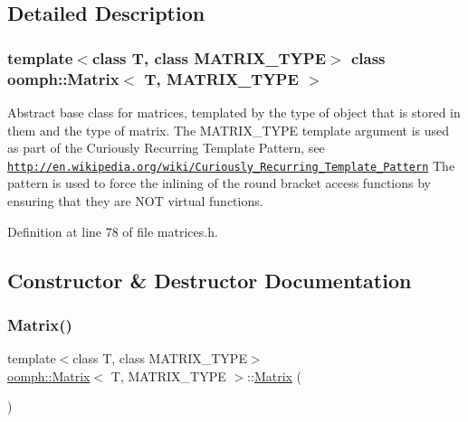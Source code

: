 \subsection{Detailed Description}
\subsubsection*{template$<$class T, class M\+A\+T\+R\+I\+X\+\_\+\+T\+Y\+PE$>$\newline
class oomph\+::\+Matrix$<$ T, M\+A\+T\+R\+I\+X\+\_\+\+T\+Y\+P\+E $>$}

Abstract base class for matrices, templated by the type of object that is stored in them and the type of matrix. The M\+A\+T\+R\+I\+X\+\_\+\+T\+Y\+PE template argument is used as part of the Curiously Recurring Template Pattern, see \href{http://en.wikipedia.org/wiki/Curiously_Recurring_Template_Pattern}{\tt http\+://en.\+wikipedia.\+org/wiki/\+Curiously\+\_\+\+Recurring\+\_\+\+Template\+\_\+\+Pattern} The pattern is used to force the inlining of the round bracket access functions by ensuring that they are N\+OT virtual functions. 

Definition at line 78 of file matrices.\+h.



\subsection{Constructor \& Destructor Documentation}
\mbox{\label{classoomph_1_1Matrix_ab414a0bf8e2658fc30d2c516f3bf4837}} 
\subsubsection{\texorpdfstring{Matrix()}{Matrix()}\hspace{0.1cm}{\footnotesize\ttfamily [1/2]}}
{\footnotesize\ttfamily template$<$class T, class M\+A\+T\+R\+I\+X\+\_\+\+T\+Y\+PE$>$ \\
\hyperlink{classoomph_1_1Matrix}{oomph\+::\+Matrix}$<$ T, M\+A\+T\+R\+I\+X\+\_\+\+T\+Y\+PE $>$\+::\hyperlink{classoomph_1_1Matrix}{Matrix} (\begin{DoxyParamCaption}{ }\end{DoxyParamCaption})\hspace{0.3cm}{\ttfamily [inline]}}



